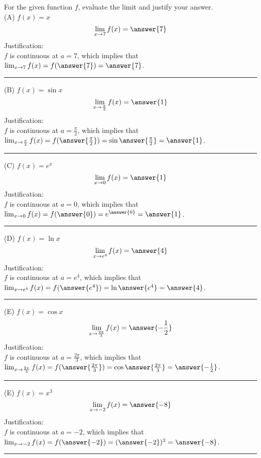 \documentclass{ximera}
\author{Nela Lakos}
\begin{document}
\begin{exercise}


For the given function $f$, evaluate the limit and justify your answer.\\



(A) $f(x)=x$
 \[
\lim_{x\to 7}f(x) = \answer{7}
\] 
Justification:\\ $f$ is continuous at $a=7$, which implies that
$\lim_{x\to 7}f(x)=f(\answer{7})=\answer{7}$.

\noindent\rule[0.5ex]{\linewidth}{.2pt}

(B) $f(x)=\sin{x}$
 \[
\lim_{x\to \frac{\pi}{2}}f(x) = \answer{1}
\] 
Justification:\\ $f$ is continuous at $a=\frac{\pi}{2}$, which implies that\\[1em]
$\lim_{x\to \frac{\pi}{2}}f(x)=f(\answer{\frac{\pi}{2}})=\sin{\answer{\frac{\pi}{2}}}=\answer{1}$.

\noindent\rule[0.5ex]{\linewidth}{.2pt}
(C) $f(x)=e^{x}$
 \[
\lim_{x\to 0}f(x) = \answer{1}
\] 
Justification:\\ $f$ is continuous at $a=0$, which implies that\\[1em]
$\lim_{x\to 0}f(x)=f(\answer{0})=e^{\answer{0}}=\answer{1}$.

\noindent\rule[0.5ex]{\linewidth}{.2pt}
(D) $f(x)=\ln{x}$
 \[
\lim_{x\to e^{4}}f(x) = \answer{4}
\] 
Justification:\\ $f$ is continuous at $a=e^{4}$, which implies that\\[1em]
$\lim_{x\to e^{4}}f(x)=f(\answer{e^{4}})=\ln{\answer{e^{4}}}=\answer{4}$.

\noindent\rule[0.5ex]{\linewidth}{.2pt}
(E) $f(x)=\cos{x}$
 \[
\lim_{x\to \frac{2\pi}{3}}f(x) = \answer{-\frac{1}{2}}
\] 
Justification:\\ $f$ is continuous at $a= \frac{2\pi}{3}$, which implies that\\[1em]
$\lim_{x\to \frac{2\pi}{3}}f(x)=f(\answer{ \frac{2\pi}{3}})=\cos{\answer{ \frac{2\pi}{3}}}=\answer{-\frac{1}{2}}$.

\noindent\rule[0.5ex]{\linewidth}{.2pt}
(E) $f(x)=x^3$
 \[
\lim_{x\to -2}f(x) = \answer{-8}
\] 
Justification:\\ $f$ is continuous at $a=-2$, which implies that\\[1em]
$\lim_{x\to -2}f(x)=f(\answer{ -2})=(\answer{-2 })^3=\answer{-8}$.

\noindent\rule[0.5ex]{\linewidth}{.2pt}
\end{exercise}
\end{document}
